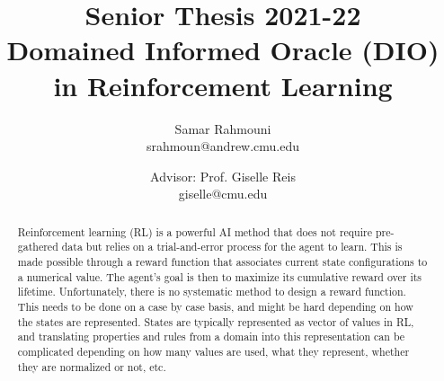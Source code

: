 \documentclass[a4paper,11pt]{article}
\author{%
  \begin{minipage}[t]{0.47\textwidth}
    \centering
    Samar Rahmouni \\ srahmoun@andrew.cmu.edu
  \end{minipage}
  \and
  \begin{minipage}[t]{0.45\textwidth}
    \centering
    Advisor: Prof. Giselle Reis \\ giselle@cmu.edu
  \end{minipage}%
  \vspace*{2ex}
}
\date{}
\title{{\Large\sc Senior Thesis 2021-22\\[2ex]}{\LARGE\bf Domained
Informed Oracle (DIO)\\ in Reinforcement Learning}\\}
\theoremstyle{definition}
\begin{document}
\maketitle 

\begin{abstract} 


  Reinforcement learning (RL) is a powerful AI method that does not
  require pre-gathered data but relies on a trial-and-error process
  for the agent to learn. 
  This is made possible through a reward function that associates
  current state configurations to a numerical value. 
  The agent's goal is then to maximize its cumulative reward over its
  lifetime. 
  Unfortunately, there is no systematic method to design a reward
  function.
  This needs to be done on a case by case basis, and might be hard
  depending on how the states are represented.
  States are typically represented as vector of values in RL, and
  translating properties and rules from a domain into this
  representation can be complicated depending on how many values are
  used, what they represent, whether they are normalized or not, etc.






\end{abstract}
\end{document}

